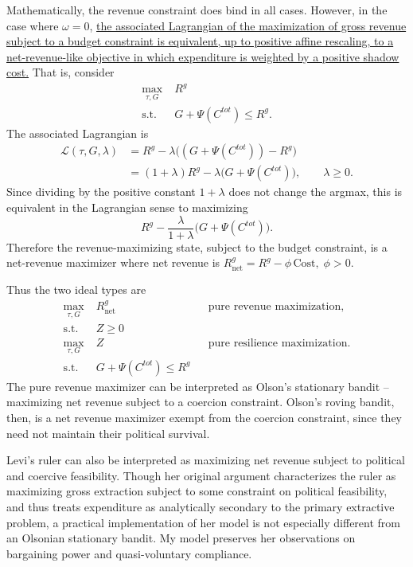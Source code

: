 \documentclass[12pt]{article}
\begin{document}
Mathematically, the revenue constraint does bind in all cases. However, in the case where $\omega = 0$, \underline{the associated Lagrangian of the maximization of gross revenue subject to a budget constraint is equivalent, up to positive affine rescaling, to a net-revenue-like objective in which expenditure is weighted by a positive shadow cost.} That is, consider
\begin{align*}
\max_{\tau, G} \;& R^g \\
\text{s.t.} \;& G + \Psi(C^{tot}) \le R^g.
\end{align*}
The associated Lagrangian is
\begin{align*}
\mathcal{L}(\tau,G,\lambda)
&= R^g - \lambda \Big((G + \Psi(C^{tot})) - R^g\Big) \\
&= (1+\lambda)R^g - \lambda\big(G + \Psi(C^{tot})\big), \qquad \lambda \ge 0.
\end{align*}
Since dividing by the positive constant $1+\lambda$ does not change the argmax, this is equivalent in the Lagrangian sense to maximizing
\begin{equation}
R^g - \frac{\lambda}{1+\lambda}\big(G + \Psi(C^{tot})\big).
\end{equation}
Therefore the revenue-maximizing state, subject to the budget constraint, is a net-revenue maximizer where net revenue is $R^g_{\text{net}} = R^g - \phi \, \text{Cost}, \; \phi > 0$.

Thus the two ideal types are
\begin{align*}
\max_{\tau, G} \;& R^g_{\text{net}} && \text{pure revenue maximization},\\
\text{s.t.} \;& Z \ge 0 \\
\max_{\tau, G} \;& Z && \text{pure resilience maximization}. \\
\text{s.t.} \;& G + \Psi(C^{tot}) \le R^g
\end{align*}
The pure revenue maximizer can be interpreted as Olson's stationary bandit -- maximizing net revenue subject to a coercion constraint. Olson's roving bandit, then, is a net revenue maximizer exempt from the coercion constraint, since they need not maintain their political survival.

Levi’s ruler can also be interpreted as maximizing net revenue subject to political and coercive feasibility. Though her original argument characterizes the ruler as maximizing gross extraction subject to some constraint on political feasibility, and thus treats expenditure as analytically secondary to the primary extractive problem, a practical implementation of her model is not especially different from an Olsonian stationary bandit. My model preserves her observations on bargaining power and quasi-voluntary compliance.
\end{document}
